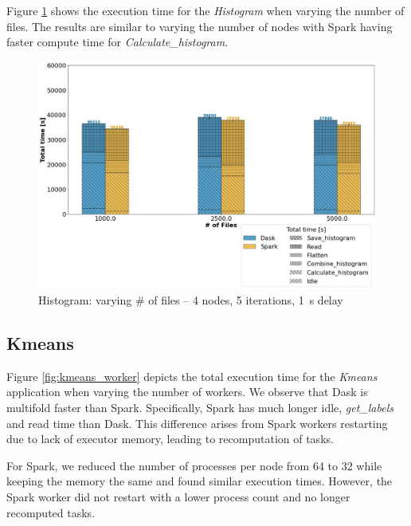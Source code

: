 \documentclass[conference]{IEEEtran}
\begin{document}
Figure \ref{fig:histogram_block} shows the execution time for the \textit{Histogram} when varying the number of files.
The results are similar to varying the number of nodes with Spark having faster compute time for \textit{Calculate\_histogram}.
\begin{figure}[!t]
	\centering
	\includegraphics[clip,width=\columnwidth]{figures/stacked_histogram_block.jpg}
	\caption{Histogram: varying \# of files -- 4 nodes, 5 iterations, \SI{1}{\second} delay}
	\label{fig:histogram_block}
\end{figure}

\subsection{Kmeans}
Figure \ref{fig:kmeans_worker} depicts the total execution time for the \textit{Kmeans} application when varying the number of workers.
We observe that Dask is multifold faster than Spark.
Specifically, Spark has much longer idle, \textit{get\_labels} and read time than Dask.
This difference arises from Spark workers restarting due to lack of executor memory, leading to recomputation of tasks.

For Spark, we reduced the number of processes per node from 64 to 32 while keeping the memory the same and found similar execution times.
However, the Spark worker did not restart with a lower process count and no longer recomputed tasks.
\end{document}
